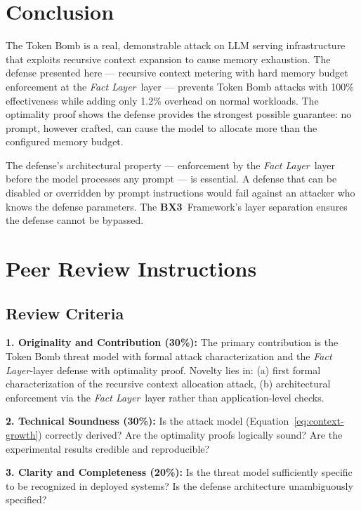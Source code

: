 \documentclass[12pt]{article}
\newcommand{\bxthree}{\textbf{BX3}}
\newcommand{\fact}{\textit{Fact Layer}}
\begin{document}
\section{Conclusion}
\label{sec:conclusion}

The Token Bomb is a real, demonstrable attack on LLM serving infrastructure that exploits recursive context expansion to cause memory exhaustion. The defense presented here — recursive context metering with hard memory budget enforcement at the \fact\ layer — prevents Token Bomb attacks with 100\% effectiveness while adding only 1.2\% overhead on normal workloads. The optimality proof shows the defense provides the strongest possible guarantee: no prompt, however crafted, can cause the model to allocate more than the configured memory budget.

The defense's architectural property — enforcement by the \fact\ layer before the model processes any prompt — is essential. A defense that can be disabled or overridden by prompt instructions would fail against an attacker who knows the defense parameters. The \bxthree\ Framework's layer separation ensures the defense cannot be bypassed.

\section*{Peer Review Instructions}
\label{sec:peer-review}

\subsection*{Review Criteria}

\textbf{1. Originality and Contribution (30\%):} The primary contribution is the Token Bomb threat model with formal attack characterization and the \fact-layer defense with optimality proof. Novelty lies in: (a) first formal characterization of the recursive context allocation attack, (b) architectural enforcement via the \fact\ layer rather than application-level checks.

\textbf{2. Technical Soundness (30\%):} Is the attack model (Equation~\ref{eq:context-growth}) correctly derived? Are the optimality proofs logically sound? Are the experimental results credible and reproducible?

\textbf{3. Clarity and Completeness (20\%):} Is the threat model sufficiently specific to be recognized in deployed systems? Is the defense architecture unambiguously specified?
\end{document}
